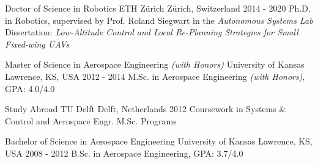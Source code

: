 

\begin{cventries}

  \cveduentry
    {Doctor of Science in Robotics} %
	{}
    {ETH Z\"{u}rich} %
    {Z\"{u}rich, Switzerland} %
    {2014 - 2020} %
    {Ph.D. in Robotics, supervised by Prof. Roland Siegwart in the \emph{Autonomous Systems Lab}}
	{Dissertation: \textit{Low-Altitude Control and Local Re-Planning Strategies for Small Fixed-wing UAVs}}
    
  \cveduentry
    {Master of Science in Aerospace Engineering \textit{(with Honors)}} %
    {}
    {University of Kansas} %
    {Lawrence, KS, USA} %
    {2012 - 2014} %
    {M.Sc. in Aerospace Engineering \textit{(with Honors)}, GPA: 4.0/4.0}
    {}
    
  \cveduentry
    {Study Abroad} %
    {}
    {TU Delft} %
    {Delft, Netherlands} %
    {2012} %
    {Coursework in Systems \& Control and Aerospace Engr. M.Sc. Programs}
    {}
    
  \cveduentry
    {Bachelor of Science in Aerospace Engineering} %
    {}
    {University of Kansas} %
    {Lawrence, KS, USA} %
    {2008 - 2012} %
    {B.Sc. in Aerospace Engineering, GPA: 3.7/4.0}
    {}
\end{cventries}
